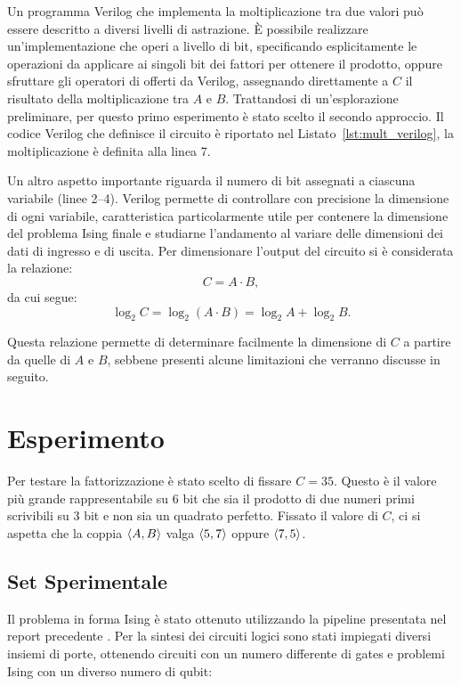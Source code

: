 \documentclass[]{article}
\begin{document}
	Un programma Verilog che implementa la moltiplicazione tra due valori può essere descritto a diversi livelli di astrazione. È possibile realizzare un'implementazione che operi a livello di bit, specificando esplicitamente le operazioni da applicare ai singoli bit dei fattori per ottenere il prodotto, oppure sfruttare gli operatori di  offerti da Verilog, assegnando direttamente a $C$ il risultato della moltiplicazione tra $A$ e $B$. Trattandosi di un'esplorazione preliminare, per questo primo esperimento è stato scelto il secondo approccio. Il codice Verilog che definisce il circuito è riportato nel Listato~\ref{lst:mult_verilog}, la moltiplicazione è definita alla linea 7.
	
	Un altro aspetto importante riguarda il numero di bit assegnati a ciascuna variabile (linee 2--4). Verilog permette di controllare con precisione la dimensione di ogni variabile, caratteristica particolarmente utile per contenere la dimensione del problema Ising finale e studiarne l'andamento al variare delle dimensioni dei dati di ingresso e di uscita. Per dimensionare l'output del circuito si è considerata la relazione:
	\[
	C = A \cdot B,
	\]
	da cui segue:
	\begin{equation}
		\log_2 C = \log_2(A \cdot B) = \log_2 A + \log_2 B.
		\label{eqn:bits}
	\end{equation}
	
	Questa relazione permette di determinare facilmente la dimensione di $C$ a partire da quelle di $A$ e $B$, sebbene presenti alcune limitazioni che verranno discusse in seguito.
	
	\section{Esperimento}
	\label{sec:exp}
	
	Per testare la fattorizzazione è stato scelto di fissare $C = 35$. Questo è il valore più grande rappresentabile su $6$ bit che sia il prodotto di due numeri primi scrivibili su 3 bit e non sia un quadrato perfetto. Fissato il valore di $C$, ci si aspetta che la coppia $\braket{A, B}$ valga $\braket{5, 7}$ oppure $\braket{7, 5}$.
	
	\subsection{Set Sperimentale}
	
	Il problema in forma Ising è stato ottenuto utilizzando la pipeline presentata nel report precedente \cite{Camino_Sperimentando}. Per la sintesi dei circuiti logici sono stati impiegati diversi insiemi di porte, ottenendo circuiti con un numero differente di gates e problemi Ising con un diverso numero di qubit:
	
\end{document}
